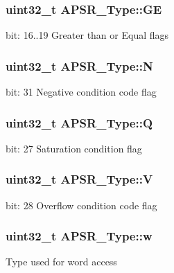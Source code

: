 \subsubsection[{\texorpdfstring{GE}{GE}}]{\setlength{\rightskip}{0pt plus 5cm}uint32\+\_\+t A\+P\+S\+R\+\_\+\+Type\+::\+GE}\hypertarget{union_a_p_s_r___type_adcb98a5b9c93b0cb69cdb7af5638f32e}{}\label{union_a_p_s_r___type_adcb98a5b9c93b0cb69cdb7af5638f32e}
bit\+: 16..19 Greater than or Equal flags 
\subsubsection[{\texorpdfstring{N}{N}}]{\setlength{\rightskip}{0pt plus 5cm}uint32\+\_\+t A\+P\+S\+R\+\_\+\+Type\+::N}\hypertarget{union_a_p_s_r___type_a7e7bbba9b00b0bb3283dc07f1abe37e0}{}\label{union_a_p_s_r___type_a7e7bbba9b00b0bb3283dc07f1abe37e0}
bit\+: 31 Negative condition code flag 
\subsubsection[{\texorpdfstring{Q}{Q}}]{\setlength{\rightskip}{0pt plus 5cm}uint32\+\_\+t A\+P\+S\+R\+\_\+\+Type\+::Q}\hypertarget{union_a_p_s_r___type_a22d10913489d24ab08bd83457daa88de}{}\label{union_a_p_s_r___type_a22d10913489d24ab08bd83457daa88de}
bit\+: 27 Saturation condition flag 
\subsubsection[{\texorpdfstring{V}{V}}]{\setlength{\rightskip}{0pt plus 5cm}uint32\+\_\+t A\+P\+S\+R\+\_\+\+Type\+::V}\hypertarget{union_a_p_s_r___type_a8004d224aacb78ca37774c35f9156e7e}{}\label{union_a_p_s_r___type_a8004d224aacb78ca37774c35f9156e7e}
bit\+: 28 Overflow condition code flag 
\subsubsection[{\texorpdfstring{w}{w}}]{\setlength{\rightskip}{0pt plus 5cm}uint32\+\_\+t A\+P\+S\+R\+\_\+\+Type\+::w}\hypertarget{union_a_p_s_r___type_ae4c2ef8c9430d7b7bef5cbfbbaed3a94}{}\label{union_a_p_s_r___type_ae4c2ef8c9430d7b7bef5cbfbbaed3a94}
Type used for word access 
